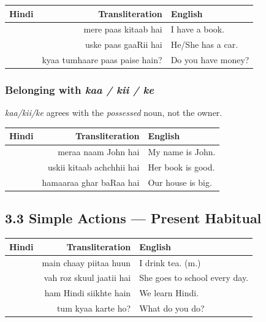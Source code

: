 \begin{tabular}{@{}HRG@{}}
  \toprule
  Hindi & Transliteration & English \\
  \midrule
       & mere paas kitaab hai    & I have a book. \\
       & uske paas gaaRii hai   & He/She has a car. \\
   & kyaa tumhaare paas paise hain? & Do you have money? \\
  \bottomrule
\end{tabular}

\subsubsection*{Belonging with \textit{kaa / kii / ke}}


\noindent\textit{kaa/kii/ke} agrees with the \emph{possessed} noun, not the owner.

\begin{tabular}{@{}HRG@{}}
  \toprule
  Hindi & Transliteration & English \\
  \midrule
         & meraa naam John hai     & My name is John. \\
     & uskii kitaab achchhii hai  & Her book is good. \\
         & hamaaraa ghar baRaa hai & Our house is big. \\
  \bottomrule
\end{tabular}

\subsection{3.3 Simple Actions — Present Habitual}


\begin{tabular}{@{}HRG@{}}
  \toprule
  Hindi & Transliteration & English \\
  \midrule
         & main chaay piitaa huun  & I drink tea. (m.) \\
    & vah roz skuul jaatii hai & She goes to school every day. \\
       & ham Hindi siikhte hain    & We learn Hindi. \\
         & tum kyaa karte ho?       & What do you do? \\
  \bottomrule
\end{tabular}

